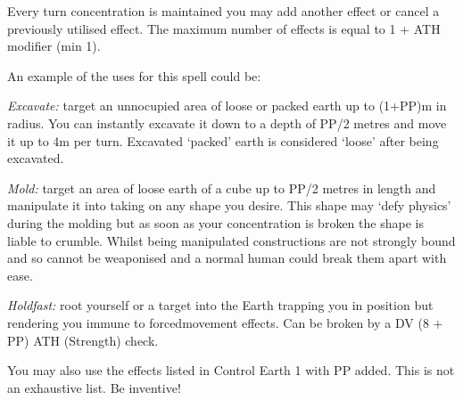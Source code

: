 \begin{multicols}{3}
{Every turn concentration is maintained you may add another effect\comma{} or cancel a previously utilised effect. The maximum number of effects is equal to 1 + ATH modifier (min 1). 

An example of the uses for this spell could be:
\begin{spellitemize}
\item {\it Excavate:} target an unnocupied area of loose or packed earth up to (1+PP)m in radius. You can instantly excavate it down to a depth of PP/2 metres\comma{} and move it up to 4m per turn. Excavated `packed' earth is considered `loose' after being excavated. 
\item {\it Mold:} target an area of loose earth of a cube up to PP/2 metres in length and manipulate it into taking on any shape you desire. This shape may `defy physics' during the molding\comma{} but as soon as your concentration is broken\comma{} the shape is liable to crumble. Whilst being manipulated\comma{} constructions are not strongly bound\comma{} and so cannot be weaponised\comma{} and a normal human could break them apart with ease. 
\item {\it Holdfast:} root yourself or a target into the Earth\comma{} trapping you in position\comma{} but rendering you immune to forced\minus{}movement effects. Can be broken by a DV (8 + PP) ATH (Strength) check.  
\end{spellitemize}You may also use the effects listed in Control Earth 1 with \PPDifference{\DVNovF}{\DVBegF} PP added. 
This is not an exhaustive list. Be inventive!}
\end{multicols}
